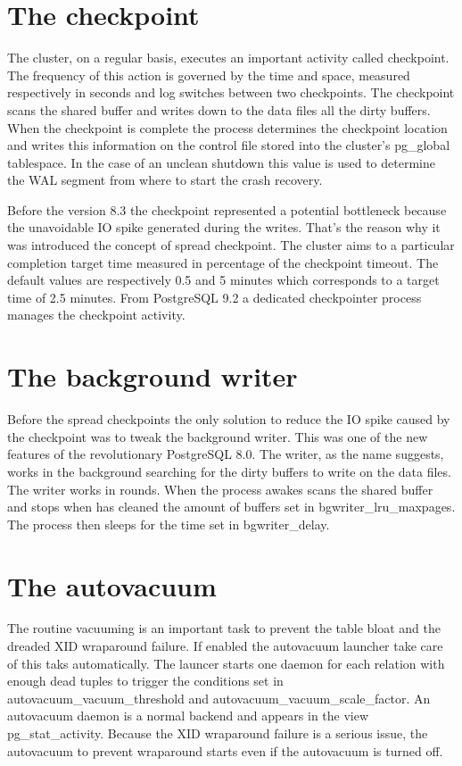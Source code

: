 \section{The checkpoint}
The cluster, on a regular basis, executes an important activity called checkpoint. The frequency 
of this action is governed by the time and space, measured respectively in seconds and log switches between 
two checkpoints. The checkpoint scans the shared buffer and writes down to the data files all the dirty 
buffers. When the checkpoint is complete the process determines the checkpoint location and writes this 
information on the control file stored into the cluster's pg\_global tablespace. In the case of an unclean 
shutdown this value is used to determine the WAL segment from where to start the crash recovery. \newline

Before the version 8.3 the checkpoint represented a potential bottleneck because the unavoidable IO spike 
generated during the writes. That's the reason why it was introduced the concept of spread checkpoint. The 
cluster aims to a particular completion target time measured in percentage of the checkpoint timeout. The 
default values are respectively 0.5 and 5 minutes which corresponds to a target time of 2.5 minutes. From 
PostgreSQL 9.2 a dedicated checkpointer process manages the checkpoint activity.


\section{The background writer}
Before the spread checkpoints the only solution to reduce the IO spike caused by the checkpoint was to 
tweak the background writer. This was one of the new features of the revolutionary PostgreSQL 8.0. The 
writer, as the name suggests, works in the background searching for the dirty buffers to write on the data 
files. The writer works in rounds. When the process awakes scans the shared buffer and stops when has 
cleaned the amount of buffers set in bgwriter\_lru\_maxpages. The process then sleeps for the time set in 
bgwriter\_delay. 

\section{The autovacuum}
The routine vacuuming is an important task to prevent the table bloat and the dreaded XID wraparound 
failure. If enabled the autovacuum launcher take care of this taks automatically. The launcer starts one 
daemon for each relation with enough dead tuples to trigger the conditions set in 
autovacuum\_vacuum\_threshold and autovacuum\_vacuum\_scale\_factor. An autovacuum daemon is a normal 
backend and appears in the view pg\_stat\_activity. Because the XID wraparound failure is a serious issue, 
the autovacuum to prevent wraparound starts even if the autovacuum is turned off.

